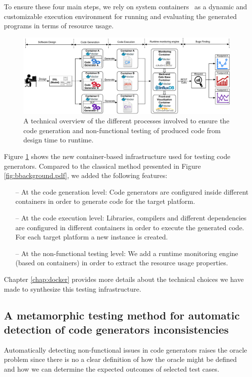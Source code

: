To ensure these four main steps, we rely on system containers~\cite{soltesz2007container} as a dynamic and customizable execution environment for running and evaluating the generated programs in terms of resource usage.

\begin{figure}[h]
	\center
	\includegraphics[width=1.\linewidth]{chapitre5/fig/docker_background2.pdf}
	\caption{A technical overview of the different processes involved to ensure the code generation and non-functional testing of produced code from design time to runtime.}
	\label{fig:cg-infra}
\end{figure}

Figure \ref{fig:cg-infra} shows the new container-based infrastructure used for testing code generators. Compared to the classical method presented in Figure \ref{fig:bbackground.pdf}, we added the following features: 
\begin{itemize}
	\item[--] At the code generation level: Code generators are configured inside different containers in order to generate code for the target platform.
	\item[--] At the code execution level: Libraries, compilers and different dependencies are configured in different containers in order to execute the generated code. For each target platform a new instance is created.
	\item[--] At the non-functional testing level: We add a runtime monitoring engine (based on containers) in order to extract the resource usage properties.
\end{itemize}

Chapter \ref{chap:docker} provides more details about the technical choices we have made to synthesize this testing infrastructure.




\subsection{A metamorphic testing method for automatic detection of code generators inconsistencies}
Automatically detecting non-functional issues in code generators raises the oracle problem since there is no a clear definition of how the oracle might be defined and how we can determine the expected outcomes of selected test cases.

